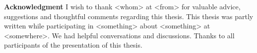\thispagestyle{empty}

\singlespacing

\vspace*{\fill}

\begin{small}
\noindent
\textbf{Acknowledgment}
I wish to thank <whom> at <from> for valuable advice, suggestions and thoughtful comments regarding this thesis. 
This thesis was partly written while participating in <something> about <something> at <somewhere>.
We had helpful conversations and discussions.
Thanks to all participants of the presentation of this thesis. 
\end{small}